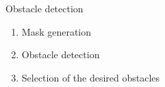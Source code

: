 \begin{frame}{Obstacle detection}
  \begin{enumerate}
    \item<1-> Mask generation
    \item<2-> Obstacle detection
    \item<3-> Selection of the desired obstacles
  \end{enumerate}

  \begin{overlayarea}{\textwidth}{0.5\textheight}
\end{overlayarea}
\end{frame}
